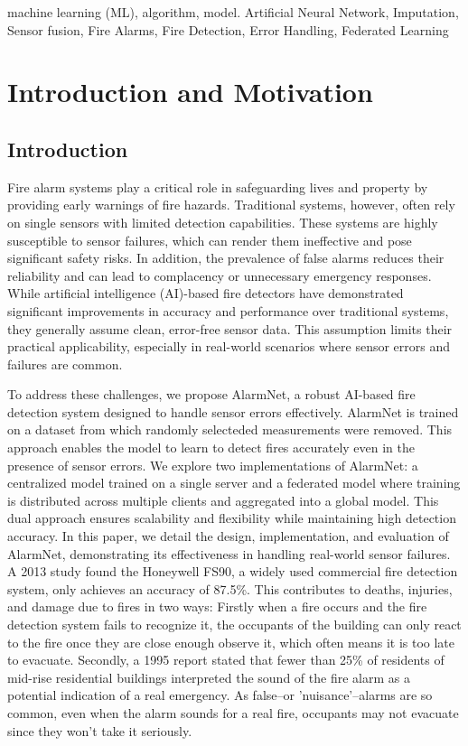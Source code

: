 \documentclass[conference]{IEEEtran}
\begin{document}
\begin{IEEEkeywords}
machine learning (ML), algorithm, model. Artificial Neural
Network, Imputation, Sensor fusion, Fire Alarms, Fire
Detection, Error Handling, Federated Learning
\end{IEEEkeywords}

\section{Introduction and Motivation}
\subsection{Introduction}\label{intro} 

Fire alarm systems play a critical role in safeguarding
lives and property by providing early warnings of fire
hazards. Traditional systems, however, often rely on single
sensors with limited detection capabilities. These systems
are highly susceptible to sensor failures, which can render
them ineffective and pose significant safety risks. In
addition, the prevalence of false alarms reduces their
reliability and can lead to complacency or unnecessary
emergency responses. While artificial intelligence
(AI)-based fire detectors have demonstrated significant
improvements in accuracy and performance over traditional
systems, they generally assume clean, error-free sensor
data. This assumption limits their practical applicability,
especially in real-world scenarios where sensor errors and
failures are common.

To address these challenges, we propose AlarmNet, a robust
AI-based fire detection system designed to handle sensor
errors effectively. AlarmNet is trained on a dataset from which
randomly selecteded measurements were removed. This approach
enables the model to learn to detect fires accurately even
in the presence of sensor errors. We explore
two implementations of AlarmNet: a centralized model trained
on a single server and a federated model where training is
distributed across multiple clients and aggregated into a
global model. This dual approach ensures scalability and
flexibility while maintaining high detection accuracy. In
this paper, we detail the design, implementation, and
evaluation of AlarmNet, demonstrating its effectiveness in
handling real-world sensor failures. A 2013 study found the
Honeywell FS90, a widely used commercial fire detection
system, only achieves an accuracy of 87.5\%\cite{smokeacc}.
This contributes to deaths, injuries, and damage due to
fires in two ways: Firstly when a fire occurs and the fire
detection system fails to recognize it, the occupants of the
building can only react to the fire once they are close
enough observe it, which often means it is too late to
evacuate. Secondly, a 1995 report stated that fewer than
25\% of residents of mid-rise residential buildings
interpreted the sound of the fire alarm as a potential
indication of a real emergency\cite{crywolf}. As false--or
'nuisance'--alarms are so common, even when the alarm sounds
for a real fire, occupants may not evacuate since they won't
take it seriously.
\end{document}
